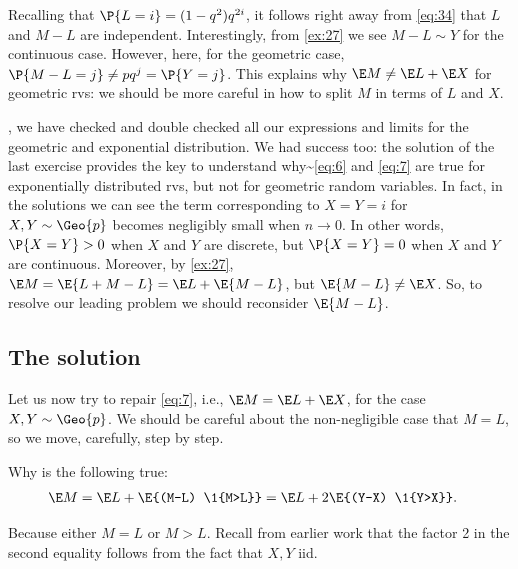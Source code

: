\documentclass[a4paper]{article}
\begin{document}
Recalling that \(\P{L=i} = (1-q^2)q^{2i}\), it follows right away from \cref{eq:34} that \(L\)  and \(M-L\) are independent.
Interestingly, from \cref{ex:27} we see \(M-L\sim Y\) for the continuous case. However, here, for the geometric case, \(\P{M-L=j} \neq pq^{j} = \P{Y=j}\).  This explains why \(\E M \neq \E L + \E X\) for geometric rvs: we should be more careful in how to split \(M\) in terms of \(L\) and \(X\).



, we have checked and double checked all our expressions and limits for the geometric and exponential distribution.
We had success too: the solution of the last exercise provides the key to understand why\textasciitilde{}\eqref{eq:6} and \eqref{eq:7} are true for exponentially distributed rvs, but not for geometric random variables.
In fact, in the solutions we can see the term corresponding to \(X=Y=i\) for \(X,Y\sim \Geo{p}\) becomes negligibly small when \(n\to 0\).
In other words, \(\P{X=Y}>0\)  when \(X\) and \(Y\) are discrete, but \(\P{X=Y}=0\) when  \(X\) and \(Y\) are continuous.
Moreover, by \cref{ex:27}, \(\E M = \E{L + M-L} = \E L + \E{M-L}\), but \(\E{M-L} \neq \E X\). So, to resolve our leading problem we should reconsider \(\E{M-L}\).
\subsection{The solution}
\label{sec:orgf5b5267}
\label{sec:solution}


Let us now try to repair \cref{eq:7}, i.e., \(\E M = \E L + \E X\),  for the case \(X,Y\sim\Geo{p}\). We should be careful about the non-negligible case that \(M=L\), so we move, carefully, step by step.

\begin{exercise}
Why is the following true:
\begin{align}
\label{eq:40}
\E M &= \E L + \E{(M-L) \1{M>L}}  = \E L + 2\E{(Y-X) \1{Y>X}}.
\end{align}
\begin{solution}
Because either \(M=L\) or \(M>L\). Recall from earlier work that the factor 2 in the second equality follows from the fact that \(X,Y\) iid.
\end{solution}
\end{exercise}
\end{document}
